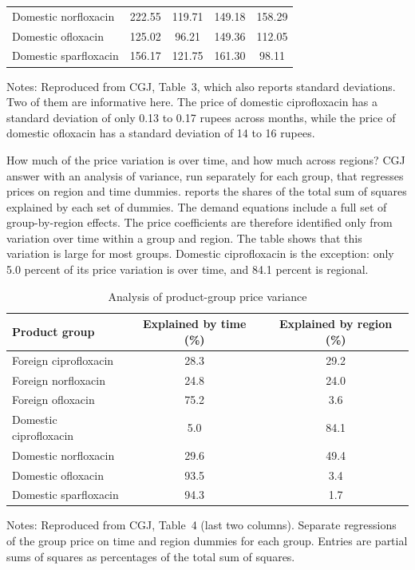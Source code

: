 \begin{table}[htbp]
\begin{tabular}{lcccc}
\quad Domestic norfloxacin & 222.55 & 119.71 & 149.18 & 158.29 \\
\quad Domestic ofloxacin & 125.02 & 96.21 & 149.36 & 112.05 \\
\quad Domestic sparfloxacin & 156.17 & 121.75 & 161.30 & 98.11 \\
\bottomrule
\end{tabular}
\par\smallskip
\begin{minipage}{0.92\textwidth}\footnotesize
Notes: Reproduced from CGJ, Table~3, which also reports standard deviations. Two of them are informative here. The
price of domestic ciprofloxacin has a standard deviation of only 0.13 to 0.17 rupees across months, while the price
of domestic ofloxacin has a standard deviation of 14 to 16 rupees.
\end{minipage}
\end{table}

How much of the price variation is over time, and how much across regions? CGJ answer with an analysis of variance,
run separately for each group, that regresses prices on region and time dummies.  reports the
shares of the total sum of squares explained by each set of dummies. The demand equations include a full set of
group-by-region effects. The price coefficients are therefore identified only from variation over time within a
group and region. The table shows that this variation is large for most groups. Domestic ciprofloxacin is the
exception: only 5.0 percent of its price variation is over time, and 84.1 percent is regional.

\begin{table}[htbp]
\centering
\caption{Analysis of product-group price variance}\label{tab:05-cgj-table4}
\small
\begin{tabular}{lcc}
\toprule
Product group & Explained by time (\%) & Explained by region (\%) \\
\midrule
Foreign ciprofloxacin & 28.3 & 29.2 \\
Foreign norfloxacin & 24.8 & 24.0 \\
Foreign ofloxacin & 75.2 & 3.6 \\
Domestic ciprofloxacin & 5.0 & 84.1 \\
Domestic norfloxacin & 29.6 & 49.4 \\
Domestic ofloxacin & 93.5 & 3.4 \\
Domestic sparfloxacin & 94.3 & 1.7 \\
\bottomrule
\end{tabular}
\par\smallskip
\begin{minipage}{0.7\textwidth}\footnotesize
Notes: Reproduced from CGJ, Table~4 (last two columns). Separate regressions of the group price on time and region
dummies for each group. Entries are partial sums of squares as percentages of the total sum of squares.
\end{minipage}
\end{table}

